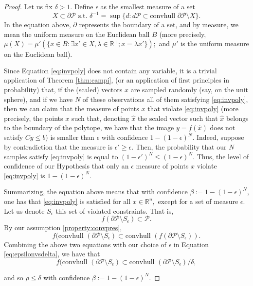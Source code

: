 \documentclass[letterpaper, 10 pt, conference]{ieeeconf}  %
\newcommand{\convhull}{\mbox{convhull } }
\newcommand{\R}{\mathbb{R} }
\newcommand{\conv}{\convhull }
\newcommand{\re}{\mathbb{R}}
\newcommand{\calP}{\mathcal{P}}
\begin{document}
\begin{proof}


Let us fix $\delta>1.$  Define $\epsilon$ as the smallest measure of a set \begin{equation}\label{eq:epsilonvsdelta} X\subset \partial \calP \mbox{ s.t. } \delta^{-1} = \sup{\{d: d \calP \subset \conv{\partial \calP\setminus X}\} }. \end{equation}
In the equation above, $\partial$ represents the boundary of a set, and by measure, we mean the uniform measure on the Euclidean ball $B$ (more precisely, $\mu(X)= \mu'(\{x\in B: \exists x'\in X, \lambda \in \re^+; x = \lambda x'\});$ and $\mu'$ is the uniform measure on the Euclidean ball).

 Since Equation \eqref{eq:invpoly} does not contain any variable, it is a trivial application of Theorem \ref{thm:campi}, (or an application of first principles in probability) that, if the (scaled) vectors $x$ are sampled randomly (say, on the unit sphere), and if we have $N$ of these observations all of them satisfying  \eqref{eq:invpoly}, then we can claim that the measure of points $x$ that violate  \eqref{eq:invpoly} (more precisely, the points $x$ such that, denoting $ \hat x$ the scaled vector such that $\hat x$ belongs to the boundary of the polytope, we have that the image $y=f(\hat x)$ does not satisfy $ Cy\leq b$) is smaller than $ \epsilon$ with confidence $1-(1-\epsilon)^N.$   Indeed, suppose by contradiction that the measure is $\epsilon ' \geq \epsilon.$ Then, the probability that our $N$ samples satisfy \eqref{eq:invpoly} is equal to $(1-\epsilon')^N \leq (1-\epsilon)^N .$  Thus, the level of confidence of our Hypothesis that only an $\epsilon$ measure of points $x$ violate  \eqref{eq:invpoly} is $1-(1-\epsilon)^N.$

Summarizing, the equation above means that with confidence $\beta := 1-(1-\epsilon)^N$, one has that \eqref{eq:invpoly} is satisfied for all $x\in \R^n,$ except for a set of measure $\epsilon.$   Let us denote $S_\epsilon$ this set of violated constraints.  That is, $$f(\partial\calP\setminus S_\epsilon) \subset \calP.$$  By our assumption \ref{property:convpres}, $$f( \convhull (\partial\calP\setminus S_\epsilon) \subset \convhull (f(\partial\calP\setminus S_\epsilon)).$$  Combining the above two equations with our choice of $\epsilon$ in Equation \eqref{eq:epsilonvsdelta},  we have that  
$$f( \convhull (\partial\calP\setminus S_\epsilon) \subset \convhull (\partial\calP\setminus S_\epsilon)/\delta,$$

and so $\rho\leq \delta$ with confidence $\beta := 1-(1-\epsilon)^N.$
 
\end{proof}
\end{document}
